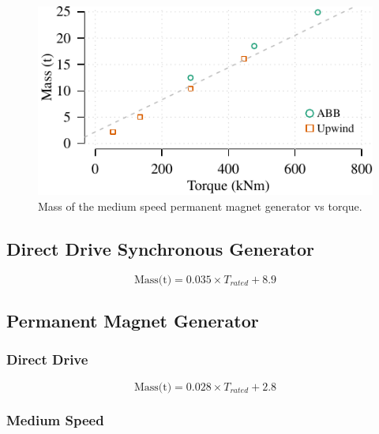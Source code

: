 \documentclass{article}\usepackage{graphicx, color}
\makeatletter
\def\maxwidth{ %
  \ifdim\Gin@nat@width>\linewidth
    \linewidth
  \else
    \Gin@nat@width
  \fi
}
\newenvironment{knitrout}{}{} %
\makeatother
\begin{document}
\begin{knitrout}
\color{fgcolor}\begin{figure}[]

\includegraphics[width=\maxwidth]{figure/plot1gpm} \caption[Mass of the medium speed permanent magnet generator vs torque]{Mass of the medium speed permanent magnet generator vs torque.\label{fig:plot1gpm}}
\end{figure}


\end{knitrout}



\subsection{Direct Drive Synchronous Generator}

\begin{equation}
  \text{Mass(t)} = 0.035 \times {T_{rated}} + 8.9
\end{equation}

\subsection{Permanent Magnet Generator}

\subsubsection{Direct Drive}

\begin{equation}
  \text{Mass(t)} = 0.028 \times {T_{rated}} + 2.8
\end{equation}


\subsubsection{Medium Speed}
\end{document}
